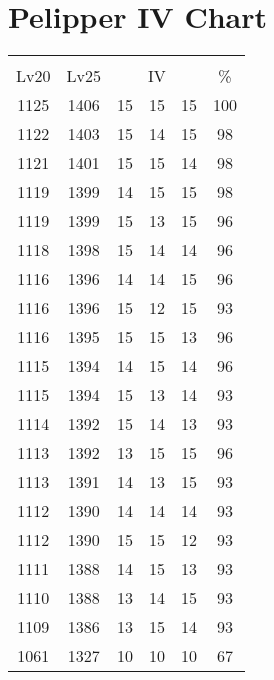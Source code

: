 \documentclass{article}%
\begin{document}
%
\normalsize%
\section{Pelipper IV Chart}%
\label{sec:Pelipper IV Chart}%
\renewcommand{\arraystretch}{1.5}%
\begin{tabular}{|c|c|c|c|c|c|}%
\hline%
\multicolumn{6}{|c|}{\textcolor{white}{ 
\linebreak{Pelipper}
}%
\cellcolor{black}}\\%
\multicolumn{1}{|c}{Lv20}&\multicolumn{1}{c|}{Lv25}&\multicolumn{3}{c|}{IV}&\multicolumn{1}{|c|}{\%}\\%
\hline%
\rowcolor{color100}%
1125&1406&15&15&15&100\\%
\hline%
\rowcolor{color98}%
1122&1403&15&14&15&98\\%
\hline%
\rowcolor{color98}%
1121&1401&15&15&14&98\\%
\hline%
\rowcolor{color98}%
1119&1399&14&15&15&98\\%
\hline%
\rowcolor{color96}%
1119&1399&15&13&15&96\\%
\hline%
\rowcolor{color96}%
1118&1398&15&14&14&96\\%
\hline%
\rowcolor{color96}%
1116&1396&14&14&15&96\\%
\hline%
\rowcolor{color93}%
1116&1396&15&12&15&93\\%
\hline%
\rowcolor{color96}%
1116&1395&15&15&13&96\\%
\hline%
\rowcolor{color96}%
1115&1394&14&15&14&96\\%
\hline%
\rowcolor{color93}%
1115&1394&15&13&14&93\\%
\hline%
\rowcolor{color93}%
1114&1392&15&14&13&93\\%
\hline%
\rowcolor{color96}%
1113&1392&13&15&15&96\\%
\hline%
\rowcolor{color93}%
1113&1391&14&13&15&93\\%
\hline%
\rowcolor{color93}%
1112&1390&14&14&14&93\\%
\hline%
\rowcolor{color93}%
1112&1390&15&15&12&93\\%
\hline%
\rowcolor{color93}%
1111&1388&14&15&13&93\\%
\hline%
\rowcolor{color93}%
1110&1388&13&14&15&93\\%
\hline%
\rowcolor{color93}%
1109&1386&13&15&14&93\\%
\hline%
\rowcolor{color91}%
1061&1327&10&10&10&67\\%
\end{tabular}

%
\end{document}
